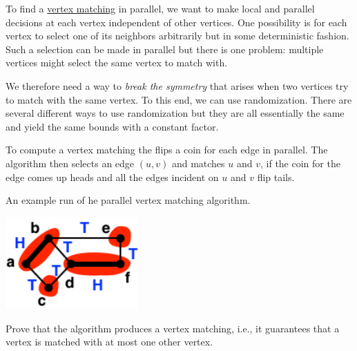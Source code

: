 \begin{gram}
To find a 
%
\href{def:graphcon::edge::vertex-matching}{vertex matching}
%
in parallel, we want to make local and parallel decisions at each vertex independent of other vertices.  
%
One possibility is for each vertex to select one of its neighbors
arbitrarily but in some deterministic fashion.
%
Such a selection can be made in parallel but there is one problem:
multiple vertices might select the same vertex to match with.
%

We therefore need a way to \emph{break the symmetry} that arises when
two vertices try to match with the same vertex.
To this end, we can use randomization.
%
There are several different ways to use randomization but they are all essentially the same and yield the same bounds with a constant factor.
\end{gram}


\begin{flex}
\begin{algorithm}
\label{alg:graphcon::edge::parallel-matching}
To compute a vertex matching the
%
%
flips a coin for each edge in parallel.
%
The algorithm then selects an edge $(u, v)$ and matches $u$ and $v$,
if the coin for the edge comes up heads and all the edges incident on
$u$ and $v$ flip tails.  
%
\end{algorithm}

\begin{example}
An example run of he parallel vertex matching algorithm.
 
\includegraphics[width=2in]{./graph-contraction/media-edge/vertex-matching-randomized.jpg}
\end{example}
\end{flex}

\begin{exercise}
Prove that the algorithm produces a vertex matching, i.e., it
guarantees that a vertex is matched with at most one other vertex.
\end{exercise}


